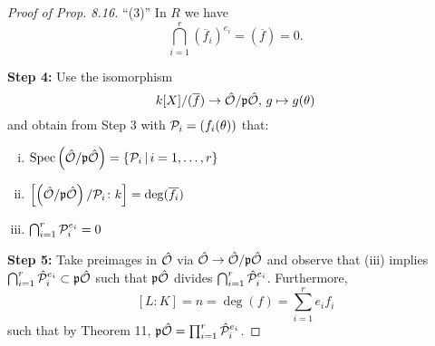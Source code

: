 \begin{proof}[Proof of Prop. 8.16]
\bigskip
\enquote{(3)} 
In $R$ we have
\[ \bigcap_{i=1}^r \left( \overline{f}_i \right)^{e_i} 
= \left( \overline{f} \right)
= 0.
\]


\bigskip \textbf{Step 4:}
Use the isomorphism 
\[
 k[X] / (\overline{f})  \to \hat{\mathcal{O}} / \mathfrak{p}\hat{\mathcal{O}}, \, g \mapsto g(\theta)
 \]
and obtain from Step 3 with $\mathcal{P}_i = \left( f_i(\theta) \right)$ that:
\begin{enumerate}[(i)]
\item $\operatorname{Spec}\left(\hat{\mathcal{O}} / \mathfrak{p}\hat{\mathcal{O}} \right) = \left\{  \mathcal{P}_i \, | \, i = 1, \dots, r  \right\}$
\item $\left[  \left(\hat{\mathcal{O}} / \mathfrak{p}\hat{\mathcal{O}}\right)/  \mathcal{P}_i  \colon k \right] = \deg (\overline{f_i})$
\item  $\bigcap_{i=1}^r \mathcal{P}_i^{e_i} = 0$
\end{enumerate}


\bigskip \textbf{Step 5:}
Take preimages in $\hat{\mathcal{O}}$ via $\hat{\mathcal{O}} \to \hat{\mathcal{O}} / \mathfrak{p}\hat{\mathcal{O}}$
and observe that (iii) implies
$\bigcap_{i=1}^r \hat{\mathcal{P}}_i^{e_i} \subset \mathfrak{p}\hat{\mathcal{O}}$ such that
$\mathfrak{p}\hat{\mathcal{O}}$ divides $\bigcap_{i=1}^r \hat{\mathcal{P}}_i^{e_i}$. Furthermore,
\[ [L:K] = n= \deg(f) = \sum_{i=1}^{r} e_if_i
\]
such that by Theorem 11, $\mathfrak{p}\hat{\mathcal{O}} = \prod_{i=1}^r \hat{\mathcal{P}}_i^{e_i}$.
\end{proof}
















